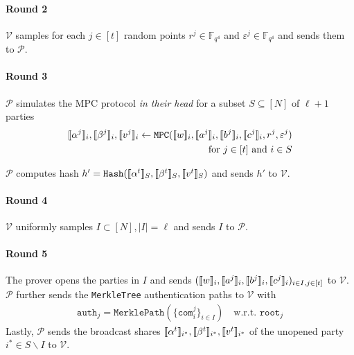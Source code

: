 \documentclass[11pt]{report}
\theoremstyle{definition}
\theoremstyle{plain}
\begin{document}
\begin{protocol}
  \paragraph{Round 2}
  $\mathcal{V}$ samples for each $j \in [t]$ random points $r^j \in \mathbb{F}_{q^4}$ and $\varepsilon^j \in \mathbb{F}_{q^4}$ and sends them to $\mathcal{P}$.

  \paragraph{Round 3} $\mathcal{P}$ simulates the MPC protocol \textit{in their head} for a subset $S \subseteq [N]$ of $\ell + 1$ parties
  \begin{align*}
    \llbracket \alpha^j \rrbracket_i, \llbracket \beta^j \rrbracket_i, \llbracket v^j \rrbracket_i \leftarrow \texttt{MPC}(\llbracket w \rrbracket_i, \llbracket a^j \rrbracket_i, \llbracket b^j \rrbracket_i,  \llbracket c^j \rrbracket_i, r^j, \varepsilon^j) \\ \text{for }j \in [t] \text{ and } i \in S
  \end{align*}

  $\mathcal{P}$ computes hash $h' = \texttt{Hash}(\llbracket \alpha^t \rrbracket_S, \llbracket \beta^t \rrbracket_S, \llbracket v^t \rrbracket_S)$ and sends $h'$ to $\mathcal{V}$.

  \paragraph{Round 4} $\mathcal{V}$ uniformly samples $I \subset [N], |I| = \ell$ and sends $I$ to $\mathcal{P}$.

  \paragraph{Round 5}
  The prover opens the parties in $I$ and sends $(\llbracket w \rrbracket_i, \llbracket a^j \rrbracket_i, \llbracket b^j \rrbracket_i, \llbracket c^j \rrbracket_i)_{i \in I, j \in [t]}$ to $\mathcal{V}$. $\mathcal{P}$ further sends the \texttt{MerkleTree} authentication paths to $\mathcal{V}$ with
  \begin{align*}
    \texttt{auth}_j = \texttt{MerklePath}(\{\texttt{com}^j_i\}_{i \in I}) \quad \text{w.r.t. }\texttt{root}_j
  \end{align*}
  Lastly, $\mathcal{P}$ sends the broadcast shares $\llbracket \alpha^t \rrbracket_{i^*}, \llbracket \beta^t \rrbracket_{i^*}, \llbracket v^t \rrbracket_{i^*}$ of the unopened party $i^* \in S \backslash I$ to $\mathcal{V}$.


\end{protocol}
\end{document}
